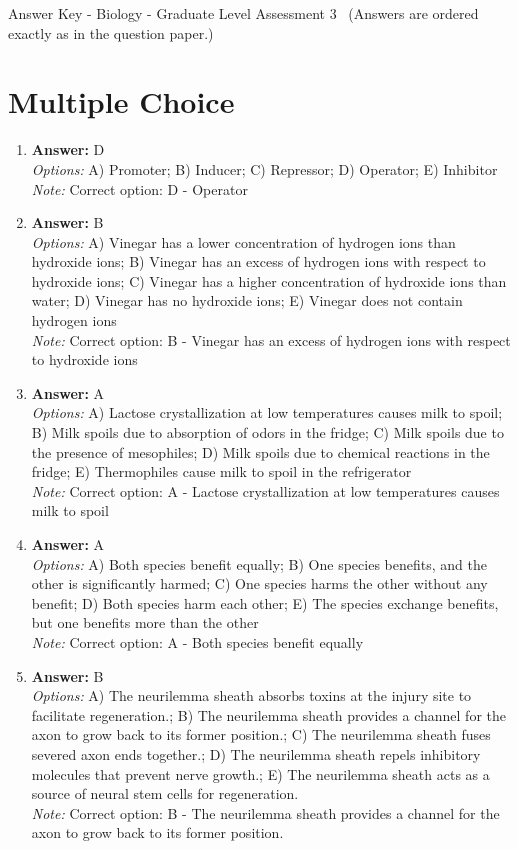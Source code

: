 \documentclass[12pt]{article}
\begin{document}
\begin{center}
Answer Key - Biology - Graduate Level Assessment 3 \
\small (Answers are ordered exactly as in the question paper.)
\end{center}

\section*{Multiple Choice}
\begin{enumerate}[label=\arabic*.]
\item \textbf{Answer:} D
\\ \textit{Options:} A) Promoter; B) Inducer; C) Repressor; D) Operator; E) Inhibitor
\\ \textit{Note:} Correct option: D - Operator
\item \textbf{Answer:} B
\\ \textit{Options:} A) Vinegar has a lower concentration of hydrogen ions than hydroxide ions; B) Vinegar has an excess of hydrogen ions with respect to hydroxide ions; C) Vinegar has a higher concentration of hydroxide ions than water; D) Vinegar has no hydroxide ions; E) Vinegar does not contain hydrogen ions
\\ \textit{Note:} Correct option: B - Vinegar has an excess of hydrogen ions with respect to hydroxide ions
\item \textbf{Answer:} A
\\ \textit{Options:} A) Lactose crystallization at low temperatures causes milk to spoil; B) Milk spoils due to absorption of odors in the fridge; C) Milk spoils due to the presence of mesophiles; D) Milk spoils due to chemical reactions in the fridge; E) Thermophiles cause milk to spoil in the refrigerator
\\ \textit{Note:} Correct option: A - Lactose crystallization at low temperatures causes milk to spoil
\item \textbf{Answer:} A
\\ \textit{Options:} A) Both species benefit equally; B) One species benefits, and the other is significantly harmed; C) One species harms the other without any benefit; D) Both species harm each other; E) The species exchange benefits, but one benefits more than the other
\\ \textit{Note:} Correct option: A - Both species benefit equally
\item \textbf{Answer:} B
\\ \textit{Options:} A) The neurilemma sheath absorbs toxins at the injury site to facilitate regeneration.; B) The neurilemma sheath provides a channel for the axon to grow back to its former position.; C) The neurilemma sheath fuses severed axon ends together.; D) The neurilemma sheath repels inhibitory molecules that prevent nerve growth.; E) The neurilemma sheath acts as a source of neural stem cells for regeneration.
\\ \textit{Note:} Correct option: B - The neurilemma sheath provides a channel for the axon to grow back to its former position.
\end{enumerate}
\end{document}
